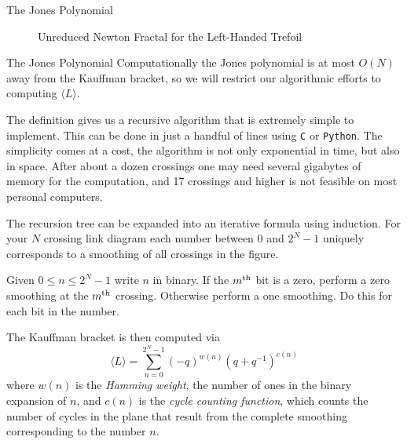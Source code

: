 \documentclass{beamer}
\begin{document}
    \begin{frame}{The Jones Polynomial}
        \begin{figure}
            \centering
            \caption{Unreduced Newton Fractal for the Left-Handed Trefoil}
        \end{figure}
    \end{frame}
    \begin{frame}{The Jones Polynomial}
        Computationally the Jones polynomial is at most
        $O(N)$ away from the Kauffman bracket, so we will restrict our
        algorithmic efforts to computing $\langle{L}\rangle$.
        \par\hfill\par
        The definition gives us a recursive algorithm that is extremely
        simple to implement. This can be done in just a handful of lines using
        \texttt{C} or \texttt{Python}. The simplicity comes at a cost,
        the algorithm is not only exponential in time, but also in space.
        After about a dozen crossings one may need several gigabytes of
        memory for the computation, and 17 crossings and higher is not
        feasible on most personal computers.
    \end{frame}
    \begin{frame}
        The recursion tree can be expanded into an iterative formula using
        induction. For your $N$ crossing link diagram each number between 0 and
        $2^{N}-1$ uniquely corresponds to a smoothing of all crossings in the
        figure.
        \par\hfill\par
        Given $0\leq{n}\leq{2}^{N}-1$ write $n$ in binary. If the
        $m^{\small\textrm{th}}$ bit is a zero, perform a zero smoothing at
        the $m^{\small\textrm{th}}$ crossing. Otherwise perform a one
        smoothing. Do this for each bit in the number.
    \end{frame}
    \begin{frame}
        The Kauffman bracket is then computed via
        \begin{equation}
            \langle{L}\rangle
            =\sum_{n=0}^{2^{N}-1}(-q)^{w(n)}(q+q^{-1})^{c(n)}
        \end{equation}
        where $w(n)$ is the \textit{Hamming weight}, the number of ones in the
        binary expansion of $n$, and $c(n)$ is the
        \textit{cycle counting function}, which counts the number of cycles
        in the plane that result from the complete smoothing corresponding to
        the number $n$.
    \end{frame}
\end{document}
